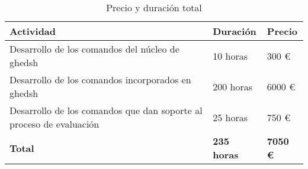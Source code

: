 \begin{table}[!ht]
\begin{center}
\begin{tabular}{|p{80mm}|p{25mm}|p{20mm}|} \hline 
\textbf{Actividad} & \textbf{Duración} & \textbf{Precio} \\ \hline

Desarrollo de los comandos del núcleo de ghedsh &
10 horas &
300 \euro{}
\\
\hline

Desarrollo de los comandos incorporados en ghedsh &
200 horas &
6000 \euro{}
\\
\hline
Desarrollo de los comandos que dan soporte al proceso de evaluación &
25 horas &
750 \euro{}
\\
\hline
\hline \hline
{\bfseries Total} &
{\bfseries 235 horas} &
{\bfseries 7050 \euro{}}
\\
\hline

\end{tabular}
\end{center}
\caption{Precio y duración total}
\label{table:resOthers3}
\end{table}

